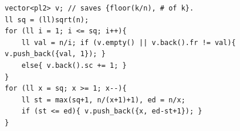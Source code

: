 \begin{verbatim}
vector<pl2> v; // saves {floor(k/n), # of k}.
ll sq = (ll)sqrt(n);
for (ll i = 1; i <= sq; i++){
	ll val = n/i; if (v.empty() || v.back().fr != val){ v.push_back({val, 1}); }
	else{ v.back().sc += 1; }
}
for (ll x = sq; x >= 1; x--){
	ll st = max(sq+1, n/(x+1)+1), ed = n/x;
	if (st <= ed){ v.push_back({x, ed-st+1}); }
}
\end{verbatim}